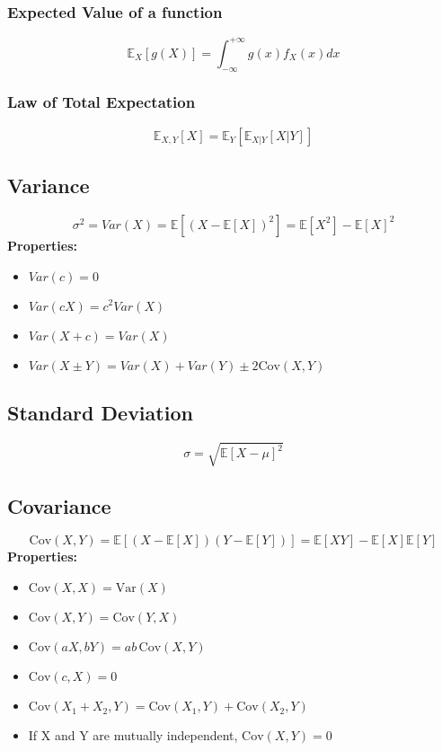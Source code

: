 \documentclass{article}
\begin{document}
\subsubsection{Expected Value of a function}
\[
    \mathbb{E}_X[g(X)] = \int_{-\infty}^{+\infty} g(x)f_X(x)dx
\]

\subsubsection{Law of Total Expectation}
\[
    \mathbb{E}_{X,Y}[X] = \mathbb{E}_Y[\mathbb{E}_{X|Y}[X|Y]]
\]

\subsection{Variance}
\[
    \sigma^2 = Var(X) = \mathbb{E}[(X - \mathbb{E}[X])^2] = \mathbb{E}[X^2] - \mathbb{E}[X]^2
\]
\textbf{Properties:}
\begin{itemize}
    \item \( Var(c) = 0 \)
    \item \( Var(cX) = c^2 Var(X) \)
    \item \( Var(X+c) = Var(X) \)
    \item \( Var(X \pm Y) = Var(X) + Var(Y) \pm 2\text{Cov}(X,Y) \)
\end{itemize}

\subsection{Standard Deviation}
\[
    \sigma = \sqrt{\mathbb{E}[X-\mu]^2}
\]

\subsection{Covariance}
\[
    \text{Cov}(X,Y) = \mathbb{E}[(X-\mathbb{E}[X])(Y-\mathbb{E}[Y])] = \mathbb{E}[XY] - \mathbb{E}[X]\mathbb{E}[Y]
\]
\textbf{Properties:}
\begin{itemize}
    \item \( \text{Cov}(X, X) = \text{Var}(X) \)
    \item \( \text{Cov}(X,Y) = \text{Cov}(Y,X) \)
    \item \( \text{Cov}(aX, bY) = ab\,\text{Cov}(X,Y) \)
    \item \( \text{Cov}(c,X) = 0 \)
    \item \( \text{Cov}(X_1+X_2, Y) = \text{Cov}(X_1,Y) + \text{Cov}(X_2,Y) \)
    \item If X and Y are mutually independent, \( \text{Cov}(X,Y) = 0 \)
\end{itemize}
\end{document}
